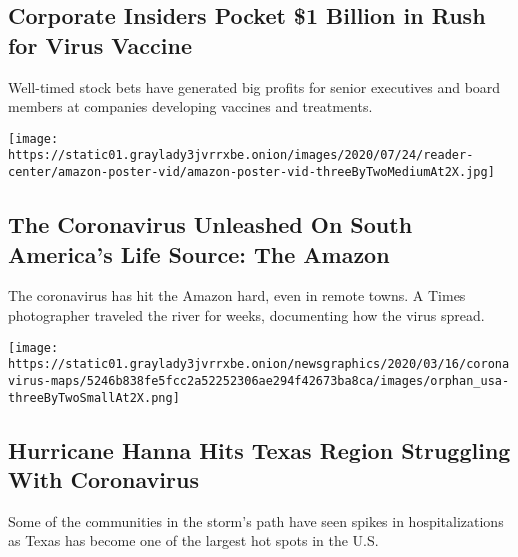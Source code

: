 \hypertarget{corporate-insiders-pocket-1-billion-in-rush-for-virus-vaccine}{%
\subsection{Corporate Insiders Pocket \$1 Billion in Rush for Virus
Vaccine}\label{corporate-insiders-pocket-1-billion-in-rush-for-virus-vaccine}}

Well-timed stock bets have generated big profits for senior executives
and board members at companies developing vaccines and treatments.

\href{/interactive/2020/07/25/world/americas/coronavirus-brazil-amazon.html}{}

\texttt{[image: https://static01.graylady3jvrrxbe.onion/images/2020/07/24/reader-center/amazon-poster-vid/amazon-poster-vid-threeByTwoMediumAt2X.jpg]}

\href{/interactive/2020/07/25/world/americas/coronavirus-brazil-amazon.html}{}

\hypertarget{the-coronavirus-unleashed-on-south-americas-life-source-the-amazon}{%
\subsection{The Coronavirus Unleashed On South America's Life Source:
The
Amazon}\label{the-coronavirus-unleashed-on-south-americas-life-source-the-amazon}}

The coronavirus has hit the Amazon hard, even in remote towns. A Times
photographer traveled the river for weeks, documenting how the virus
spread.

\texttt{[image: https://static01.graylady3jvrrxbe.onion/newsgraphics/2020/03/16/coronavirus-maps/5246b838fe5fcc2a52252306ae294f42673ba8ca/images/orphan\_usa-threeByTwoSmallAt2X.png]}

\href{/2020/07/25/us/hanna-storm-texas.html}{}

\hypertarget{hurricane-hanna-hits-texas-region-struggling-with-coronavirus}{%
\subsection{Hurricane Hanna Hits Texas Region Struggling With
Coronavirus}\label{hurricane-hanna-hits-texas-region-struggling-with-coronavirus}}

Some of the communities in the storm's path have seen spikes in
hospitalizations as Texas has become one of the largest hot spots in the
U.S.

\href{/2020/07/25/us/hanna-storm-texas.html}{}

